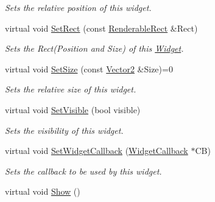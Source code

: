 \begin{DoxyCompactItemize}
\begin{DoxyCompactList}\small\item\em Sets the relative position of this widget. \item\end{DoxyCompactList}\item 
virtual void \hyperlink{classMezzanine_1_1UI_1_1Widget_aed66a04577944a3c76e628185aa7bb3e}{SetRect} (const \hyperlink{structMezzanine_1_1UI_1_1RenderableRect}{RenderableRect} \&Rect)
\begin{DoxyCompactList}\small\item\em Sets the Rect(Position and Size) of this \hyperlink{classMezzanine_1_1UI_1_1Widget}{Widget}. \item\end{DoxyCompactList}\item 
virtual void \hyperlink{classMezzanine_1_1UI_1_1Widget_adf8b14ce6641d4ec12f6ff09814fc9ab}{SetSize} (const \hyperlink{classMezzanine_1_1Vector2}{Vector2} \&Size)=0
\begin{DoxyCompactList}\small\item\em Sets the relative size of this widget. \item\end{DoxyCompactList}\item 
virtual void \hyperlink{classMezzanine_1_1UI_1_1Widget_ad13df3d78b4e7cebfc566dc678706915}{SetVisible} (bool visible)
\begin{DoxyCompactList}\small\item\em Sets the visibility of this widget. \item\end{DoxyCompactList}\item 
virtual void \hyperlink{classMezzanine_1_1UI_1_1Widget_a7cab967bfe466c1f2796cc17559ca1f3}{SetWidgetCallback} (\hyperlink{classMezzanine_1_1UI_1_1WidgetCallback}{WidgetCallback} $\ast$CB)
\begin{DoxyCompactList}\small\item\em Sets the callback to be used by this widget. \item\end{DoxyCompactList}\item 
\hypertarget{classMezzanine_1_1UI_1_1Widget_a863195baafaee7ab8a0887c660525bf6}{
virtual void \hyperlink{classMezzanine_1_1UI_1_1Widget_a863195baafaee7ab8a0887c660525bf6}{Show} ()}
\label{classMezzanine_1_1UI_1_1Widget_a863195baafaee7ab8a0887c660525bf6}


\end{DoxyCompactItemize}
